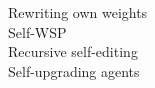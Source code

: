 Rewriting own weights \citep{ax2611_21885}\\ Self-WSP \citep{ax2611_28833}\\ Recursive self-editing \citep{ax2611_29513}\\ Self-upgrading agents \citep{ax2611_31117}

